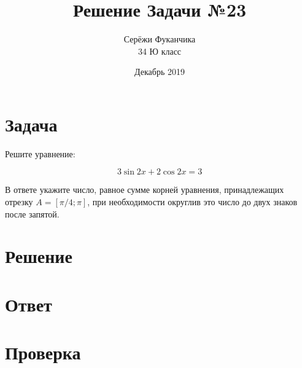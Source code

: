 \documentclass{article}
\title{Решение Задачи №23}
\author{Серёжи Фуканчика\\34 Ю класс}
\date{Декабрь 2019}
\begin{document}
\maketitle

\section{Задача}
Решите уравнение:

$$3\sin{}2x+2\cos{}2x=3$$

В ответе укажите число, равное сумме корней уравнения, принадлежащих отрезку $A=[\pi/4;\pi]$, при необходимости округлив это число до двух знаков после запятой.

\section{Решение}

\section{Ответ}

\section{Проверка}
\end{document}
